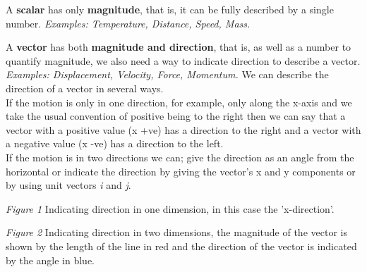 \documentclass[12pt, letterpaper, twoside]{article}
\begin{document}
A \textbf{scalar} has only \textbf{magnitude}, that is, it can be fully described by a single number.
\linebreak 
\textit{Examples: Temperature, Distance, Speed, Mass.}

\bigskip    


A \textbf{vector} has both \textbf{magnitude and direction}, that is, as well as a number to quantify magnitude, we also need a way to indicate direction to describe a vector. 
\linebreak
\textit{Examples: Displacement, Velocity, Force, Momentum.}
\bigskip
We can describe the direction of a vector in several ways. \\ If the motion is only in one direction, for example, only along the x-axis and we take the usual convention of positive being to the right then we can say that a vector with a positive value (x +ve) has a direction to the right and a vector with a negative value (x -ve) has a direction to the left.\\  If the motion is in two directions we can; give the direction as an angle from the horizontal or indicate the direction by giving the vector's x and y components or by using unit vectors \textit{i} and \textit{j}.
$$ $$

$$ $$
\textit{Figure 1} Indicating direction in one dimension, in this case the 'x-direction'.

\newpage

$$ $$
\textit{Figure 2} Indicating direction in two dimensions, the magnitude of the vector is shown by the length of the line in red and the direction of the vector is indicated by the angle in blue.
\end{document}
